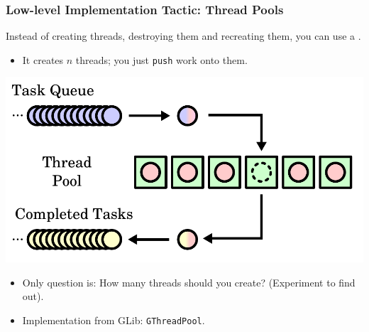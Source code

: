 \begin{frame}
  \frametitle{Low-level Implementation Tactic: Thread Pools}
  
  
    Instead of creating threads, destroying them and recreating them, you
      can use a .
    \begin{itemize}
    \item It creates $n$ threads; you just {\tt push} work onto them.
    \end{itemize}

  \begin{center}
    \includegraphics[scale=0.4]{images/thread-pool}
  \end{center}

  \begin{itemize}
    \item Only question is: How many threads should you create? (Experiment to find out).
    \item Implementation from GLib: {\tt GThreadPool}.
  \end{itemize}
  

\end{frame}




